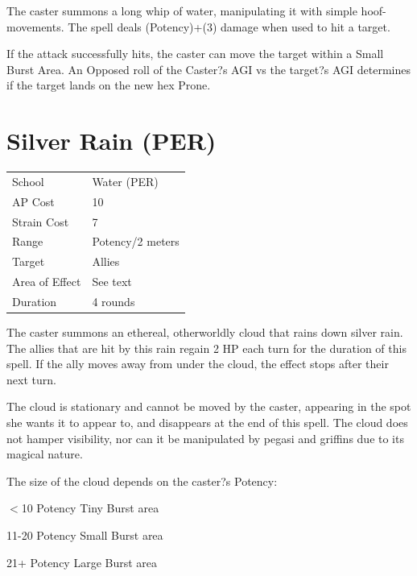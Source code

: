 \documentclass[11pt,a4paper,twocolumn]{book}
\begin{document}
	\medskip
	
	The caster summons a long whip of water, manipulating it with simple hoof-movements. The spell deals (Potency)+(3) damage when used to hit a target. 
	
	If the attack successfully hits, the caster can move the target within a Small Burst Area. An Opposed roll of the Caster?s AGI vs the target?s AGI determines if the target lands on the new hex Prone.
	
					\section*{Silver Rain (PER)}
	{
		\begin{tabu} to 75mm{| X[l,4] | X[l,7] |}
			\hline
			School 			&  Water (PER)			\\
			AP Cost	      	&  10					\\
			Strain Cost     &  7					\\
			Range     		&  Potency/2 meters		\\
			Target      	&  Allies				\\
			Area of Effect  &  See text	 			\\
			Duration     	&  4 rounds				\\ \hline
		\end{tabu}
		
	}
	
	\medskip
	
	The caster summons an ethereal, otherworldly cloud that rains down silver rain. The allies that are hit by this rain regain 2 HP each turn for the duration of this spell. If the ally moves away from under the cloud, the effect stops after their next turn.
	
	The cloud is stationary and cannot be moved by the caster, appearing in the spot she wants it to appear to, and disappears at the end of this spell. The cloud does not hamper visibility, nor can it be manipulated by pegasi and griffins due to its magical nature.
	
	The size of the cloud depends on the caster?s Potency:
	\begin{compactitem}
		\item $<$10 Potency 		Tiny Burst area
		\item 11-20 Potency 		Small Burst area
		\item 21+ Potency 			Large Burst area
	\end{compactitem}
	
\end{document}
